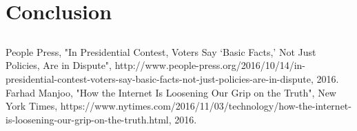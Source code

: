\documentclass{paper}
\begin{document}
\section{Conclusion}

\subsection{}
\subsubsection{}

\paragraph{}
\subparagraph{}

\begin{thebibliography}{9}
  People Press,
  "In Presidential Contest, Voters Say ‘Basic Facts,’ Not Just Policies, Are in Dispute",
  http://www.people-press.org/2016/10/14/in-presidential-contest-voters-say-basic-facts-not-just-policies-are-in-dispute,
  2016.
  Farhad Manjoo,
  "How the Internet Is Loosening Our Grip on the Truth",
  New York Times,
  https://www.nytimes.com/2016/11/03/technology/how-the-internet-is-loosening-our-grip-on-the-truth.html,
  2016.


\end{thebibliography}
\end{document}
